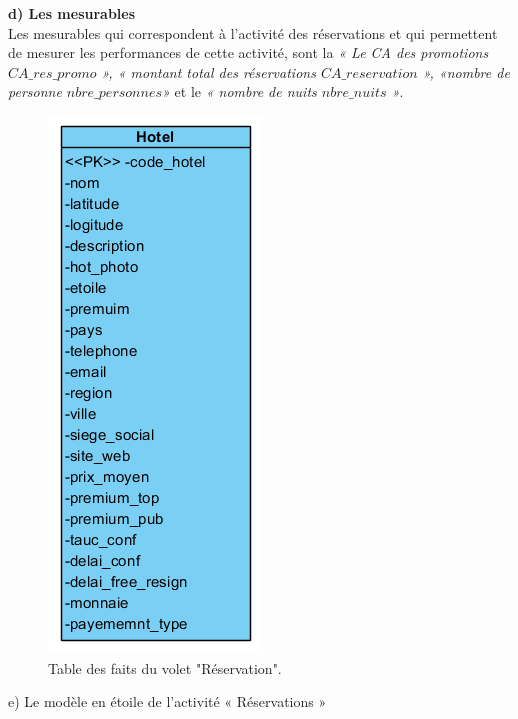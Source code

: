 \textbf{d) Les mesurables}\\
Les mesurables qui correspondent à l’activité des réservations et qui permettent de mesurer les performances de cette activité, sont la \textit{« Le CA des promotions \(CA\_res\_promo\) », « montant total des réservations \(CA\_reservation\) », «nombre de personne \(nbre\_personnes\)»}  et le \textit{« nombre de nuits \(nbre\_nuits\) »}.

\begin{figure}[!htbp]
	\begin{center}
		\includegraphics[scale=0.65]{images/dim_hotel.png}
		\caption{Table des faits du volet "Réservation".}
		\label{use_bi_tools}
	\end{center}
	\end{figure}

e) Le modèle en étoile de l’activité « Réservations »

